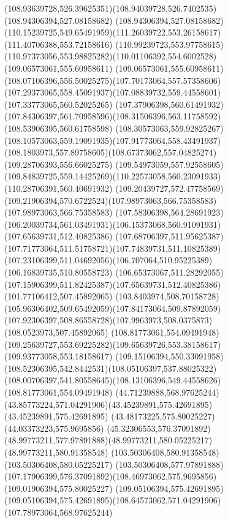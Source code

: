 {{	\curveto(108.93639728,526.39625351)(108.94039728,526.7402535)(108.94306394,527.08158682)
	\curveto(108.94306394,527.08158682)(110.15239725,549.65491959)(111.26039722,553.26158617)
	\lineto(111.40706388,553.72158616)
	\lineto(110.99239723,553.97758615)
	\curveto(110.97373056,553.98825282)(110.01106392,554.6002528)(109.06573061,555.60958611)
	\curveto(109.06573061,555.60958611)(108.07106396,556.50025275)(107.70173064,557.57358606)
	\curveto(107.29373065,558.45091937)(107.08839732,559.44558601)(107.33773065,560.52025265)
	\curveto(107.37906398,560.61491932)(107.84306397,561.70958596)(108.31506396,563.11758592)
	\lineto(108.53906395,560.61758598)
	\curveto(108.30573063,559.92825267)(108.10573063,559.19091935)(107.91773064,558.43491937)
	\curveto(108.1803973,557.89758605)(108.67373062,557.04825274)(109.28706393,556.66025275)
	\curveto(109.54973059,557.92558605)(109.84839725,559.14425269)(110.22573058,560.23091933)
	\lineto(110.28706391,560.40691932)
	\lineto(109.20439727,572.47758569)
	\curveto(109.21906394,570.6722524)(107.98973063,566.75358583)(107.98973063,566.75358583)
	\curveto(107.58306398,564.28691923)(106.20039734,561.03491931)(106.15373068,560.91091931)
	\moveto(107.65639731,512.40825386)
	\curveto(107.68706397,511.95625387)(107.71773064,511.51758721)(107.74839731,511.10825389)
	\curveto(107.23106399,511.04692056)(106.707064,510.95225389)(106.16839735,510.80558723)
	\curveto(106.65373067,511.28292055)(107.15906399,511.82425387)(107.65639731,512.40825386)
	\moveto(101.77106412,507.45892065)
	\curveto(103.8403974,508.70158728)(105.96306402,509.65492059)(107.84173064,509.87892059)
	\curveto(107.92306397,508.86558728)(107.9963973,508.0375873)(108.0523973,507.45892065)
	\closepath
	\moveto(108.81773061,554.09491948)
	\curveto(109.25639727,553.69225282)(109.65639726,553.38158617)(109.93773058,553.18158617)
	\curveto(109.15106394,550.33091958)(108.52306395,542.8442531)(108.05106397,537.88025322)
	\curveto(108.00706397,541.80558645)(108.13106396,549.44558626)(108.81773061,554.09491948)
	\moveto(44.71239888,568.97625244)
	\curveto(43.85773224,571.04291906)(43.45239891,575.42691895)(43.45239891,575.42691895)
	\lineto(43.48173225,575.80025227)
	\lineto(44.03373223,575.9695856)
	\curveto(45.32306553,576.37091892)(48.99773211,577.97891888)(48.99773211,580.05225217)
	\lineto(48.99773211,580.91358548)
	\lineto(103.50306408,580.91358548)
	\lineto(103.50306408,580.05225217)
	\curveto(103.50306408,577.97891888)(107.17906399,576.37091892)(108.46973062,575.9695856)
	\lineto(109.01906394,575.80025227)
	\lineto(109.05106394,575.42691895)
	\curveto(109.05106394,575.42691895)(108.64573062,571.04291906)(107.78973064,568.97625244)
}}
